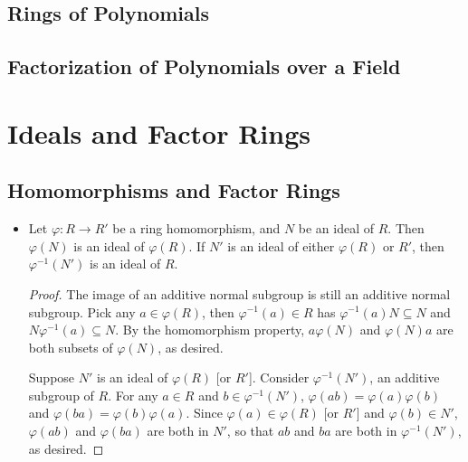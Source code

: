 \documentclass[11pt]{article}
\renewcommand{\phi}{\varphi}
\begin{document}
\subsection{Rings of Polynomials}
\subsection{Factorization of Polynomials over a Field}



\section{Ideals and Factor Rings}
\setcounter{subsection}{25}
\subsection{Homomorphisms and Factor Rings}
\begin{itemize}
    \item Let $\phi\colon R \to R'$ be a ring homomorphism, and $N$ be an ideal of $R$. Then $\phi(N)$ is an ideal of $\phi(R)$. If $N'$ is an ideal of either $\phi(R)$ or $R'$, then $\phi^{-1}(N')$ is an ideal of $R$.    
    \begin{proof}
        The image of an additive normal subgroup is still an additive normal subgroup. Pick any $a \in \phi(R)$, then $\phi^{-1}(a) \in R$ has $\phi^{-1}(a)N \subseteq N$ and $N\phi^{-1}(a) \subseteq N$. By the homomorphism property, $a \phi(N)$ and $\phi(N)a$ are both subsets of $\phi(N)$, as desired.

        Suppose $N'$ is an ideal of $\phi(R)$ [or $R'$]. Consider $\phi^{-1}(N')$, an additive subgroup of $R$. For any $a \in R$ and $b \in \phi^{-1}(N')$, $\phi(ab)=\phi(a)\phi(b)$ and $\phi(ba)=\phi(b)\phi(a)$. Since $\phi(a) \in \phi(R)$ [or $R'$] and $\phi(b) \in N'$, $\phi(ab)$ and $\phi(ba)$ are both in $N'$, so that $ab$ and $ba$ are both in $\phi^{-1}(N')$, as desired.
    \end{proof}
\end{itemize}
\end{document}
